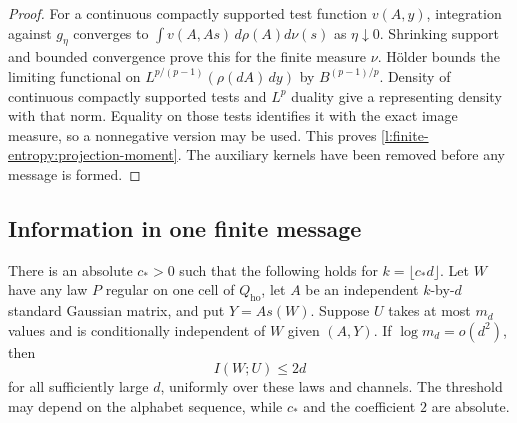 \begin{proof}
For a continuous compactly supported test function \(v(A,y)\),
integration against \(g_\eta\) converges to
\(\int v(A,As)\,d\rho(A)d\nu(s)\) as \(\eta\downarrow0\).
Shrinking support and bounded convergence prove this for the finite
measure \(\nu\).  H\"older bounds the limiting functional on
\(L^{p/(p-1)}(\rho(dA)\,dy)\) by \(B^{(p-1)/p}\).
Density of continuous compactly supported tests and \(L^p\) duality
give a representing density with that norm.  Equality on those tests
identifies it with the exact image measure, so a nonnegative version
may be used.  This proves \eqref{l:finite-entropy:projection-moment}.
The auxiliary kernels have been removed before any message is formed.
\end{proof}

\subsection{Information in one finite message}

\begin{lemma}\label{l:finite-entropy:block}
There is an absolute \(c_*>0\) such that the following holds for
\(k=\lfloor c_*d\rfloor\).  Let \(W\) have any law \(P\) regular
on one cell of \(Q_{\mathrm{ho}}\), let \(A\) be an independent
\(k\)-by-\(d\) standard Gaussian matrix, and put \(Y=As(W)\).
Suppose \(U\) takes at most \(m_d\) values and is conditionally
independent of \(W\) given \((A,Y)\).  If
\(\log m_d=o(d^2)\), then
\begin{equation}\label{l:finite-entropy:block-information}
 I(W;U)\le2d
\end{equation}
for all sufficiently large \(d\), uniformly over these laws and
channels.  The threshold may depend on the alphabet sequence, while
\(c_*\) and the coefficient \(2\) are absolute.
\end{lemma}

